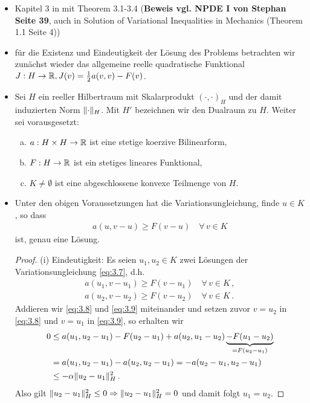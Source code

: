 \begin{itemize}
\item Kapitel 3 in \cite{KikOden} mit Theorem 3.1-3.4 (\textbf{Beweis vgl. NPDE I von Stephan Seite 39}, auch in Solution of Variational Inequalities in Mechanics (Theorem 1.1 Seite 4))

\item für die Existenz und Eindeutigkeit der Lösung des Problems betrachten wir zunächst wieder das allgemeine reelle quadratische Funktional $J: H \rightarrow \mathbb{R}, J(v) = \frac 1 2 a(v,v) - F(v)$.

\item \begin{vor}
Sei $H$ ein reeller Hilbertraum mit Skalarprodukt $(\cdot,\cdot)_H$ und der damit induzierten Norm $\lVert \cdot\rVert_H$. Mit $H'$ bezeichnen wir den Dualraum zu $H$. Weiter sei vorausgesetzt:
\begin{enumerate}[(a)]
\item $a: H\times H \rightarrow \mathbb{R}$ ist eine stetige koerzive Bilinearform,
\item $F:H\rightarrow\mathbb{R}$ ist ein stetiges lineares Funktional,
\item $K\not = \emptyset$ ist eine abgeschlossene konvexe Teilmenge von $H$.
\end{enumerate}
\end{vor}

\item \begin{theorem}\label{theorem:3.5}
Unter den obigen Voraussetzungen hat die Variationsungleichung, finde $u\in K$, so dass
\begin{align}\label{eq:3.7}
	a(u,v-u) \ge F(v-u) \quad \forall \, v \in K
\end{align}
ist, genau eine Lösung.
\end{theorem}

\begin{proof}
(i) Eindeutigkeit: Es seien $u_1,u_2 \in K$ zwei Lösungen der Variationsungleichung \eqref{eq:3.7}, d.h.
\begin{align}\label{eq:3.8}
	a(u_1,v-u_1) \ge F(v-u_1) \quad \forall \, v \in K\, , \\
	a(u_2,v-u_2) \ge F(v-u_2) \quad \forall \, v \in K\, . \label{eq:3.9}
\end{align}
Addieren wir \eqref{eq:3.8} und \eqref{eq:3.9} miteinander und setzen zuvor $v = u_2$ in \eqref{eq:3.8} und $v = u_1$ in \eqref{eq:3.9}, so erhalten wir
\begin{align*}
	0 & \le a(u_1,u_2-u_1) - F(u_2-u_1) + a(u_2,u_1-u_2) \underbrace{- F(u_1-u_2)}_{=F(u_2-u_1)}  \\
	& = a(u_1,u_2-u_1)-a(u_2,u_2-u_1) = -a(u_2-u_1,u_2-u_1) \\
	& \le -\alpha \lVert u_2-u_1\rVert_H^2 \, .
\end{align*}
Also gilt $\lVert u_2-u_1\rVert_H^2 \le 0 \Rightarrow \lVert u_2-u_1\rVert_H^2 = 0$ und damit folgt $u_1 = u_2$.


\end{proof}
\end{itemize}
